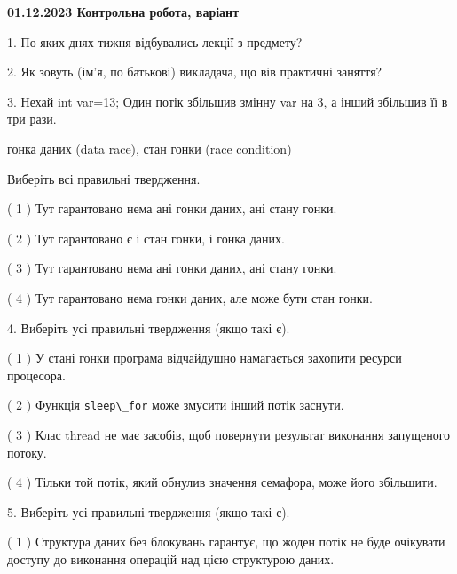 \documentclass[12pt, ukrainian]{article}
\def\code#1{\Verb!#1!}
\begin{document}
\vspace{4mm}
\newpage
\begin {large}

\textbf{01.12.2023 Контрольна робота, варіант  }\par


{
1. По яких днях тижня відбувались лекції з предмету?



\vspace{5mm}
2. Як зовуть (ім'я, по батькові) викладача, що вів практичні заняття?



\vspace{5mm}
3. Нехай int var=13; Один потік збільшив змінну var на 3, а інший збільшив її в три рази.

гонка даних (data race), стан гонки (race condition)

Виберіть всі правильні твердження.\par
\vspace{2mm}
( 1 ) Тут гарантовано нема ані гонки даних, ані стану гонки.%

( 2 ) Тут гарантовано є і стан гонки, і гонка даних.%

( 3 ) Тут гарантовано нема ані гонки даних, ані стану гонки.%

( 4 ) Тут гарантовано нема гонки даних, але може бути стан гонки.%


\vspace{5mm}
4. Виберіть усі правильні твердження (якщо такі є).\par
\vspace{2mm}

( 1 ) У стані гонки програма відчайдушно намагається захопити ресурси процесора.%

( 2 ) Функція \code{sleep\_for} може змусити інший потік заснути.%

( 3 ) Клас thread не має засобів, щоб повернути результат виконання запущеного потоку.%

( 4 ) Тільки той потік, який обнулив значення семафора, може його збільшити.%


\vspace{5mm}
5. Виберіть усі правильні твердження (якщо такі є).\par
\vspace{2mm}

( 1 ) Структура даних без блокувань гарантує, що жоден потік не буде очікувати доступу до виконання операцій над цією структурою даних.%

}
\end{large}
\end{document}
